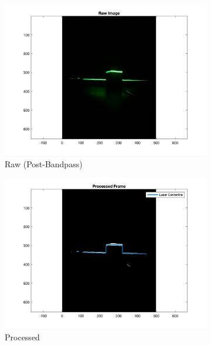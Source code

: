 \documentclass{article}
\begin{document}
\begin{figure} [!h]

	\centering
	
	\begin{subfigure}{.5\textwidth}
	    \centering
    	\includegraphics[width=1\linewidth]{camera-raw.jpg}
    	\caption{Raw (Post-Bandpass)}
    	\label{fig:image:raw}
    \end{subfigure}%
	\begin{subfigure}{.5\textwidth}
	    \centering
    	\includegraphics[width=1\linewidth]{camera-processed.jpg}
    	\caption{Processed}
    	\label{fig:image:processed}
    \end{subfigure}
	
	\caption{}
	
	\label{fig:image}
\end{figure}
\end{document}
